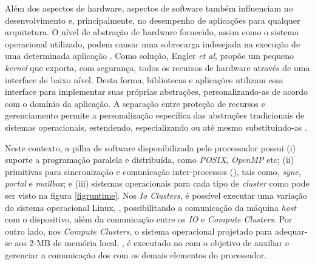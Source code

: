 \documentclass[
	12pt,				%
	openright,			%
	twoside,			%
	a4paper,			%
	english,			%
	brazil,				%
	]{abntex2}
\begin{document}

Além dos aspectos de hardware, aspectos de software também influenciam no desenvolvimento e, principalmente, no desempenho de aplicações para qualquer arquitetura.
O nível de abstração de hardware fornecido, assim como o sistema operacional utilizado, podem causar uma sobrecarga indesejada na execução de uma determinada aplicação \cite{Appel:1991:VMP:106972.106984, Cao:1994:IPA:1267638.1267651, Harty:1992:APM:143365.143511, Krueger:1993:TDA:165854.165867, Stonebraker:1981:OSS:358699.358703, Levy:Exception}.
Como solução, Engler \textit{et al}, propõe um pequeno \textit{kernel} que exporta, com segurança, todos os recursos de hardware através de uma interface de baixo nível.
Desta forma, bibliotecas e aplicações utilizam essa interface para implementar suas próprias abstrações, personalizando-as de acordo com o domínio da aplicação.
A separação entre proteção de recursos e gerenciamento permite a personalização específica das abstrações tradicionais de sistemas operacionais, estendendo, especializando ou até mesmo substituindo-as \cite{engler_exokernel:_1995}.

Neste contexto, a pilha de software disponibilizada pelo processador \mppa possui (i) suporte a programação paralela e distribuída, como \textit{POSIX}, \textit{OpenMP} etc; (ii) primitivas para sincronização e comunicação inter-processos (\ipc), tais como, \textit{sync}, \textit{portal} e \textit{mailbox}; e (iii) sistemas operacionais para cada tipo de \textit{cluster} como pode ser visto na figura \ref{figruntime}.
Nos \textit{Io Clusters}, é possível executar uma variação do sistema operacional Linux, \rtems, possibilitando a comunicação da máquina \textit{host} com o dispositivo, além da comunicação entre os \textit{IO} e \textit{Compute Clusters}.
Por outro lado, nos \textit{Compute Clusters}, o sistema operacional projetado para adequar-se aos 2-MB de memória local, \nodeos, é executado no \rman com o objetivo de auxiliar e gerenciar a comunicação dos \pe com os demais elementos do processador.
\end{document}
